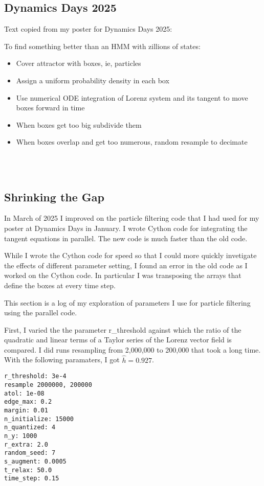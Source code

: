 \documentclass[12pt]{article}
\begin{document}
\subsection{Dynamics Days 2025}
\label{sec:particle_result}

Text copied from my poster for Dynamics Days 2025:

To find something better than an HMM with zillions of states:
\begin{itemize}
\item Cover attractor with boxes, ie, particles
\item Assign a uniform probability density in each box
\item Use numerical ODE integration of Lorenz system and its tangent
  to move boxes forward in time
\item When boxes get too big subdivide them
\item When boxes overlap and get too numerous, random resample to
  decimate
\end{itemize}
\begin{center}
  \\
  \\
\end{center}

\subsection{Shrinking the Gap}
\label{sec:particle_search}

In March of 2025 I improved on the particle filtering code that I had
used for my poster at Dynamics Days in January.  I wrote Cython code
for integrating the tangent equations in parallel.  The new code is
much faster than the old code.

While I wrote the Cython code for speed so that I could more quickly
invetigate the effects of different parameter setting, I found an
error in the old code as I worked on the Cython code.  In particular I
was transposing the arrays that define the boxes at every time step.

This section is a log of my exploration of parameters I use for
particle filtering using the parallel code.

First, I varied the the parameter r\_threshold against which the ratio
of the quadratic and linear terms of a Taylor series of the Lorenz
vector field is compared.  I did runs resampling from 2,000,000 to
200,000 that took a long time.  With the following paramaters, I got
$\hat h = 0.927$.
\begin{verbatim}
r_threshold: 3e-4
resample 2000000, 200000
atol: 1e-08
edge_max: 0.2
margin: 0.01
n_initialize: 15000
n_quantized: 4
n_y: 1000
r_extra: 2.0
random_seed: 7
s_augment: 0.0005
t_relax: 50.0
time_step: 0.15
\end{verbatim}
\end{document}
